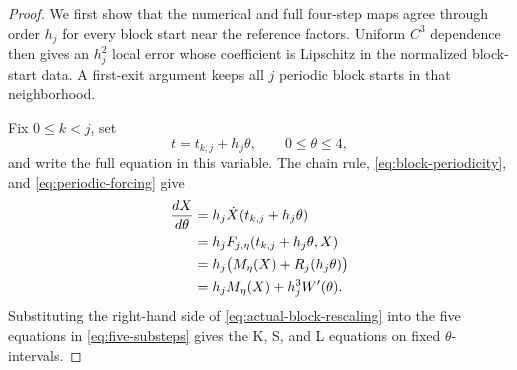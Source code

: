 \documentclass[]{article}
\numberwithin{equation}{section}
\theoremstyle{plain}
\theoremstyle{remark}
\begin{document}
\begin{proof}
We first show that the numerical and full four-step maps agree through
order $h_j$ for every block start near the reference factors.  Uniform
$C^3$ dependence then gives an $h_j^2$ local error whose coefficient is
Lipschitz in the normalized block-start data.  A first-exit argument
keeps all $j$ periodic block starts in that neighborhood.

Fix $0\le k<j$, set
\[
 t=t_{k,j}+h_j\theta,
 \qquad 0\le\theta\le4,
\]
and write the full equation in this variable.  The chain rule,
\eqref{eq:block-periodicity}, and \eqref{eq:periodic-forcing} give
\begin{align}
 \frac{dX}{d\theta}
 &=h_j\dot X(t_{k,j}+h_j\theta)\notag\\
 &=h_jF_{j,\eta}(t_{k,j}+h_j\theta,X)\notag\\
 &=h_j\bigl(M_\eta(X)+R_j(h_j\theta)\bigr)\notag\\
 &=h_jM_\eta(X)+h_j^3W'(\theta).
 \label{eq:actual-block-rescaling}
\end{align}
Substituting the right-hand side of
\eqref{eq:actual-block-rescaling} into the five equations in
\eqref{eq:five-substeps} gives the K, S, and L equations on fixed
$\theta$-intervals.


\end{proof}
\end{document}
